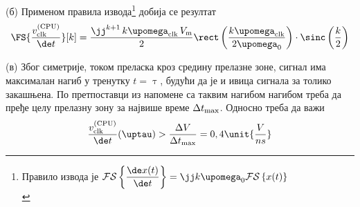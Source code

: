     (б) Применом правила извода\footnote{Правило извода је 
    $
    \mathcal{FS}\left\{\dfrac{\de x(t)}{\de t}\right\} = \jj k \upomega_{\rm 0} 
    \mathcal{FS}\left\{ x(t) \right\} $ \\[1mm]} добија се резултат
    \begin{equation}
        \FS{ \dfrac{v_{\rm clk}^{\rm (CPU)}}{\de t}} [k]
        = 
        \dfrac{ 
        \jj^{k+1} \,
        k \upomega_{\rm clk} \, 
        V_{\rm m} }{2}
        \rect \left( \dfrac{k{\upomega_{\rm clk}}}{2\upomega_0} \right) 
        \cdot
        \sinc \left(
        \dfrac{k}{2} \right)
    \end{equation}

    (в) 
    Због симетрије, током преласка кроз средину прелазне зоне, сигнал има максималан нагиб у тренутку 
    $t = \uptau$, будући да је и ивица сигнала за толико закашњена. По претпоставци из напомене 
    са таквим нагибом нагибом треба да пређе целу прелазну зону за највише време 
    $\Delta t_{\rm max}$. Односно треба да важи
    \begin{equation}
        \dfrac{ v_{\rm clk}^{\rm (CPU)} }{\de t} (\uptau) > \dfrac{\Delta V}{\Delta t_{\rm max}}
        = 0,4\unit{\dfrac{V}{ns}}  \label{eq:\ID.uslov}
    \end{equation}

